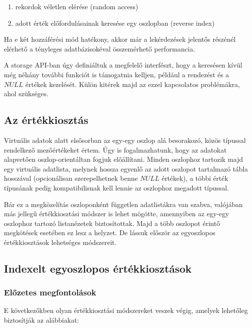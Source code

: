 \documentclass[
    parspace,
    noindent,
    nohyp,
]{elteiktdk}[2023/04/10]
\begin{document}
\begin{enumerate}
  \item rekordok véletlen elérése (random access)
  \item adott érték előfordulásainak keresése egy oszlopban (reverse index)
\end{enumerate}

Ha e két hozzáférési mód hatékony, akkor már a lekérdezések jelentős részénél
elérhető a tényleges adatbázisokéval összemérhető performancia.

A storage API-ban úgy definiáltuk a megfelelő interfészt,
hogy a keresésen kívül még néhány további funkciót is támogatnia kelljen,
például a rendezést és a $NULL$ értékek kezelését.
Külön kitérek majd az ezzel kapcsolatos problémákra, ahol szükséges.


\subsection{Az értékkiosztás }

Virtuális adatok alatt elsősorban az egy-egy oszlop alá besorakozó,
közös típussal rendelkező mezőértékeket értem.
Úgy is fogalmazhatunk, hogy az adatokat alapvetően oszlop-orientáltan fogjuk előállítani.
Minden oszlophoz tartozik majd egy virtuális adatlista,
melynek hossza egyenlő az adott oszlopot tartalmazó tábla hosszával
(opcionálisan szerepelhetnek benne $NULL$ értékek),
a többi érték típusának pedig kompatibilisnak kell lennie az oszlophoz megadott típussal.

Bár ez a megközelítás oszloponként független adatlistákra van szabva,
valójában más jellegű értékkiosztási módszer is lehet mögötte,
amennyiben az egy-egy oszlophoz tartozó listanézetek biztosítottak.
Majd a több oszlopot érintő megkötések esetében ez lesz a helyzet.
De lássuk először az egyoszlopos értékkiosztások lehetséges módszereit.

\subsection{Indexelt egyoszlopos értékkiosztások}

\subsubsection{Előzetes megfontolások}

E következőkben olyan értékkiosztási módszereket veszek végig,
amelyek lehetőleg biztosítják az alábbiakat:
\end{document}
